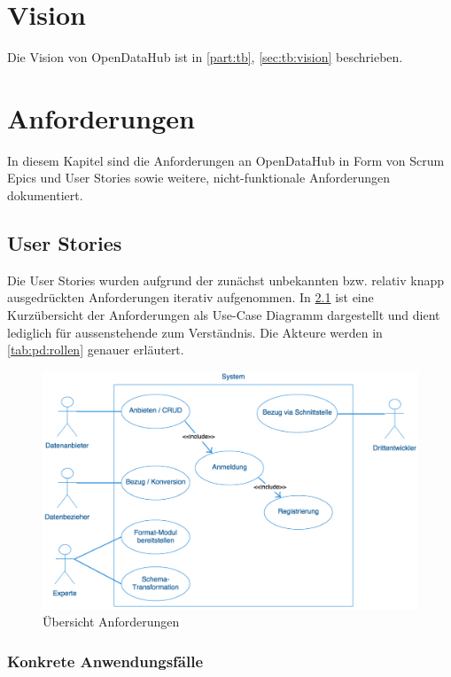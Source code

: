\chapter{Vision}
Die Vision von OpenDataHub ist in \cref{part:tb}, \vref{sec:tb:vision} beschrieben.


\chapter{Anforderungen}
In diesem Kapitel sind die Anforderungen an OpenDataHub in Form von Scrum Epics und User Stories sowie weitere, nicht-funktionale Anforderungen dokumentiert.


\section{User Stories}\label{sec:pd:user-stories}

Die User Stories wurden aufgrund der zunächst unbekannten bzw. relativ knapp ausgedrückten Anforderungen iterativ aufgenommen. In \cref{fig:pd:uc-diagramm} ist eine Kurzübersicht der Anforderungen als Use-Case Diagramm dargestellt und dient lediglich für aussenstehende zum Verständnis. Die Akteure werden in \cref{tab:pd:rollen} genauer erläutert.

\begin{figure}[H]
	\centering
	\includegraphics[width=0.9\linewidth]{fig/uc-diagramm}
	\caption{Übersicht Anforderungen}
	\label{fig:pd:uc-diagramm}
\end{figure}

\subsection{Konkrete Anwendungsfälle}
\label{sec:pd:usecases}

